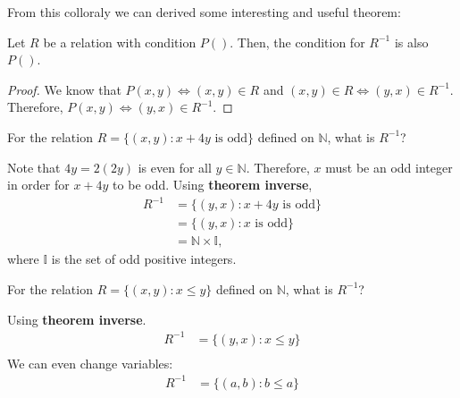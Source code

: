 \documentclass[12pt]{article}
\newcommand{\N}{\mathbb{N}}
\newenvironment{theorem}[2][Theorem]{\begin{trivlist}
		\item[\hskip \labelsep {\bfseries #1}\hskip \labelsep {\bfseries #2.}]}{\end{trivlist}}
\newenvironment{problem}[2][Problem]{\begin{trivlist}
		\item[\hskip \labelsep {\bfseries #1}\hskip \labelsep {\bfseries #2.}]}{\end{trivlist}}
\newenvironment{solution}[2][Solution]{\begin{trivlist}
		\item[\hskip \labelsep {\bfseries #1}\hskip \labelsep {\bfseries #2.}]}{\end{trivlist}}
\begin{document}
	From this colloraly we can derived some interesting and useful theorem:
	\begin{theorem}{inverse}
		Let $R$ be a relation with condition $P()$. Then, the condition for $R^{-1}$ is also $P()$.
		\begin{proof}
			We know that $P(x,y)\iff (x,y)\in R$ and $(x,y)\in R\iff (y,x) \in R^{-1}$. Therefore, $P(x,y) \iff (y,x)\in R^{-1}$.
		\end{proof}
	\end{theorem}

	\begin{problem}{7}
		For the relation $R=\{(x,y):x+4y \text{ is odd}\}$ defined on $\N$, what is $R^{-1}$?
		\begin{solution}{7}
			Note that $4y = 2(2y)$ is even for all $y\in \N$. Therefore, $x$ must be an odd integer in order for $x+4y$ to be odd. Using \textbf{theorem inverse}, 
			\begin{align*}
				R^{-1} &= \{(y,x):x+4y \text{ is odd}\} \\
				&= \{(y,x):x \text{ is odd}\}\\
				&= \N \times \mathbb{I},
			\end{align*}
		where $\mathbb{I}$ is the set of odd positive integers.
		\end{solution}
	\end{problem}
 
	\begin{problem}{8}
		For the relation $R=\{(x,y):x\leq y\}$ defined on $\N$, what is $R^{-1}$?
		\begin{solution}{8}
			Using \textbf{theorem inverse}.
			\begin{align*}
				R^{-1} &= \{(y,x):x\leq y\}\\
			\end{align*}
		We can even change variables:
		\begin{align*}
			R^{-1} &= \{(a,b):b\leq a\}
		\end{align*}
		\end{solution}
	\end{problem}
\end{document}
